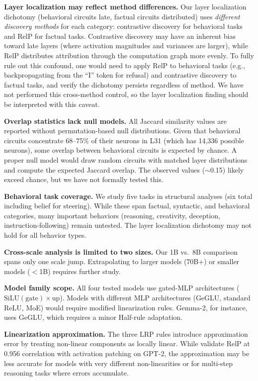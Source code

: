 \documentclass[11pt]{article}
\begin{document}
\textbf{Layer localization may reflect method differences.}
Our layer localization dichotomy (behavioral circuits late, factual circuits distributed) uses \emph{different discovery methods} for each category: contrastive discovery for behavioral tasks and RelP for factual tasks.
Contrastive discovery may have an inherent bias toward late layers (where activation magnitudes and variances are larger), while RelP distributes attribution through the computation graph more evenly.
To fully rule out this confound, one would need to apply RelP to behavioral tasks (e.g., backpropagating from the ``I'' token for refusal) and contrastive discovery to factual tasks, and verify the dichotomy persists regardless of method.
We have not performed this cross-method control, so the layer localization finding should be interpreted with this caveat.

\textbf{Overlap statistics lack null models.}
All Jaccard similarity values are reported without permutation-based null distributions.
Given that behavioral circuits concentrate 68--75\% of their neurons in L31 (which has 14,336 possible neurons), some overlap between behavioral circuits is expected by chance.
A proper null model would draw random circuits with matched layer distributions and compute the expected Jaccard overlap.
The observed values (${\sim}$0.15) likely exceed chance, but we have not formally tested this.

\textbf{Behavioral task coverage.}
We study five tasks in structural analyses (six total including belief for steering). While these span factual, syntactic, and behavioral categories, many important behaviors (reasoning, creativity, deception, instruction-following) remain untested.
The layer localization dichotomy may not hold for all behavior types.

\textbf{Cross-scale analysis is limited to two sizes.}
Our 1B vs.\ 8B comparison spans only one scale jump.
Extrapolating to larger models (70B+) or smaller models ($<$1B) requires further study.

\textbf{Model family scope.}
All four tested models use gated-MLP architectures ($\text{SiLU}(\text{gate}) \times \text{up}$).
Models with different MLP architectures (GeGLU, standard ReLU, MoE) would require modified linearization rules.
Gemma-2, for instance, uses GeGLU, which requires a minor Half-rule adaptation.

\textbf{Linearization approximation.}
The three LRP rules introduce approximation error by treating non-linear components as locally linear.
While \citet{jafari2025relp} validate RelP at 0.956 correlation with activation patching on GPT-2, the approximation may be less accurate for models with very different non-linearities or for multi-step reasoning tasks where errors accumulate.
\end{document}
